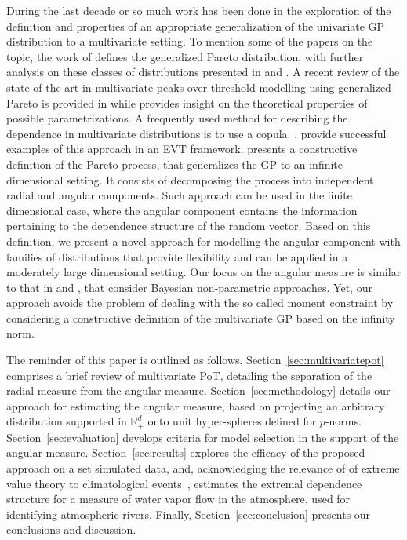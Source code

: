 During the last decade or so much work has been done in the exploration of the definition and properties of an
  appropriate generalization of the univariate GP distribution 
  to a multivariate setting.  To mention some of the papers on the topic, the work of
  \cite{rootzen2006} defines the generalized Pareto distribution, with further analysis on these classes
  of distributions presented in \cite{falk2008} and \cite{michel2008}.  A recent review of the state
  of the art in multivariate peaks over threshold modelling using generalized Pareto is provided in
  \cite{rootzen2018} while \cite{RoSeWa2018a} provides insight on the theoretical properties of possible parametrizations. 
  A frequently used method for describing the dependence
  in multivariate distributions is to use a copula. \cite{renard2007,falk2019}, provide successful examples of this approach in an EVT framework. \cite{ferreira2014} presents a constructive definition of the Pareto process, that generalizes the GP to an infinite dimensional setting. It consists of decomposing the process into independent radial and angular components. Such approach can be used in the finite dimensional case, where the angular component 
  contains the information pertaining to the dependence structure of the random vector.
  Based on this definition, we present a novel approach for modelling  the angular component
  with families of distributions that provide flexibility and can be applied in a moderately large dimensional setting.
  Our focus on the  angular measure is similar to that in \cite{SaNa2014} and \cite{HaCaCh2017}, that consider Bayesian non-parametric approaches. Yet, our approach avoids the problem of dealing with the so called moment constraint by considering a constructive definition of the multivariate GP based on the infinity norm.
  
  The reminder of this paper is outlined as follows. Section~\ref{sec:multivariatepot} comprises a brief review of multivariate PoT, detailing the separation of the radial measure from the angular measure.
  Section~\ref{sec:methodology} details our approach for estimating the angular measure, based on projecting an arbitrary distribution supported in ${\mathbb R}_+^d$ onto unit hyper-spheres defined for $p$-norms. Section~\ref{sec:evaluation} develops criteria for model selection in the support of the angular measure.  Section~\ref{sec:results} explores the efficacy of the proposed approach on a set simulated data, and, acknowledging the relevance of of extreme value theory to climatological events~\citep{jentsch2007,vousdoukas2018,li2019}, estimates the extremal dependence structure for a measure of water vapor flow in the atmosphere, used for identifying atmospheric rivers.  Finally, Section~\ref{sec:conclusion} presents our conclusions and discussion.

